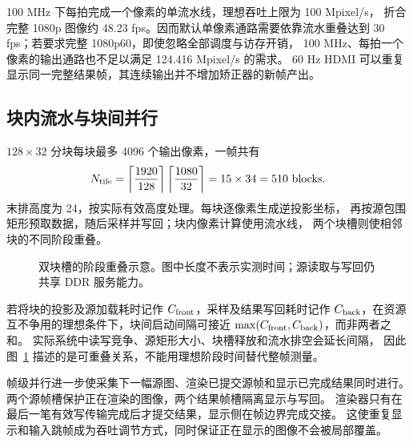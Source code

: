 100 MHz 下每拍完成一个像素的单流水线，理想吞吐上限为 100 Mpixel/s，
折合完整 1080p 图像约 48.23 fps。因而默认单像素通路需要依靠流水重叠达到
30 fps；若要求完整 1080p60，即使忽略全部调度与访存开销，
100 MHz、每拍一个像素的输出通路也不足以满足 124.416 Mpixel/s 的需求。
60 Hz HDMI 可以重复显示同一完整结果帧，其连续输出并不增加矫正器的新帧产出。

\subsection{块内流水与块间并行}
$128\times32$ 分块每块最多 4096 个输出像素，一帧共有
\begin{equation}
N_{\rm tile}=\left\lceil\frac{1920}{128}\right\rceil
\left\lceil\frac{1080}{32}\right\rceil=15\times34=510\ \text{blocks}.
\end{equation}
末排高度为 24，按实际有效高度处理。每块逐像素生成逆投影坐标，
再按源包围矩形预取数据，随后采样并写回；块内像素计算使用流水线，
两个块槽则使相邻块的不同阶段重叠。

\begin{figure}[htbp]
\centering
{}
\caption{双块槽的阶段重叠示意。图中长度不表示实测时间；源读取与写回仍共享 DDR 服务能力。}
\label{fig:rt-overlap}
\end{figure}

若将块的投影及源加载耗时记作 $C_{\rm front}$，采样及结果写回耗时记作
$C_{\rm back}$，在资源互不争用的理想条件下，块间启动间隔可接近
$\max(C_{\rm front},C_{\rm back})$，而非两者之和。
实际系统中读写竞争、源矩形大小、块槽释放和流水排空会延长间隔，
因此图~\ref{fig:rt-overlap} 描述的是可重叠关系，不能用理想阶段时间替代整帧测量。

帧级并行进一步使采集下一幅源图、渲染已提交源帧和显示已完成结果同时进行。
两个源帧槽保护正在渲染的图像，两个结果帧槽隔离显示与写回。
渲染器只有在最后一笔有效写传输完成后才提交结果，显示侧在帧边界完成交接。
这使重复显示和输入跳帧成为吞吐调节方式，同时保证正在显示的图像不会被局部覆盖。
\begingroup{}
\endgroup

